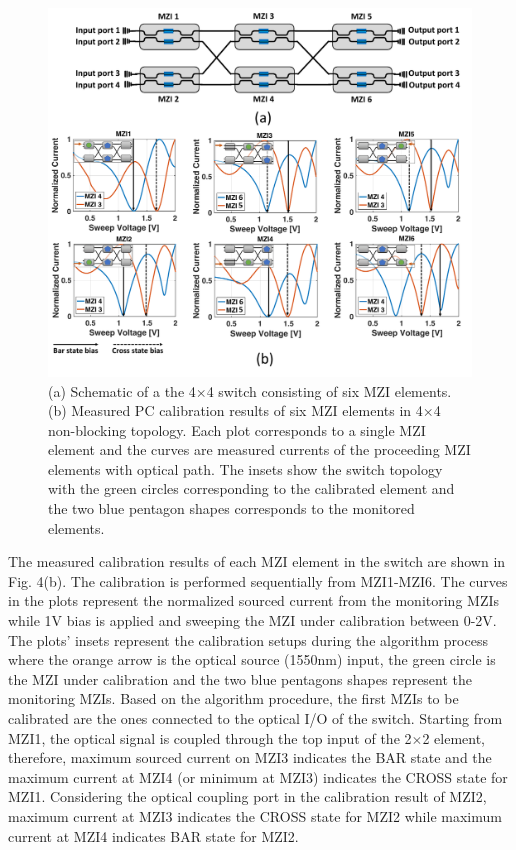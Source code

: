 \begin{figure}[t!]
\centering\includegraphics[width=13.5cm]{Chapter5/fig4_PC_switch_2}
\vspace{-4mm}
\caption{(a) Schematic of a the 4$\times$4 switch consisting of six MZI elements. (b) Measured PC calibration results of six MZI elements in 4$\times$4 non-blocking topology. Each plot corresponds to a single MZI element and the curves are measured currents of the proceeding MZI elements with optical path. The insets show the switch topology with the green circles corresponding to the calibrated element and the two blue pentagon shapes corresponds to the monitored elements.}
\end{figure}

The measured calibration results of each MZI element in the switch are shown in Fig. 4(b). The calibration is performed sequentially from MZI1-MZI6. The curves in the plots represent the normalized sourced current from the monitoring MZIs while 1V bias is applied and sweeping the MZI under calibration between 0-2V. The plots' insets represent the calibration setups during the algorithm process where the orange arrow is the optical source (1550nm) input, the green circle is the MZI under calibration and the two blue pentagons shapes represent the monitoring MZIs. Based on the algorithm procedure, the first MZIs to be calibrated are the ones connected to the optical I/O of the switch. Starting from MZI1, the optical signal is coupled through the top input of the 2$\times$2 element, therefore, maximum sourced current on MZI3 indicates the BAR state and the maximum current at MZI4 (or minimum at MZI3) indicates the CROSS state for MZI1. Considering the optical coupling port in the calibration result of MZI2, maximum current at MZI3 indicates the CROSS state for MZI2 while maximum current at MZI4 indicates BAR state for MZI2. 


